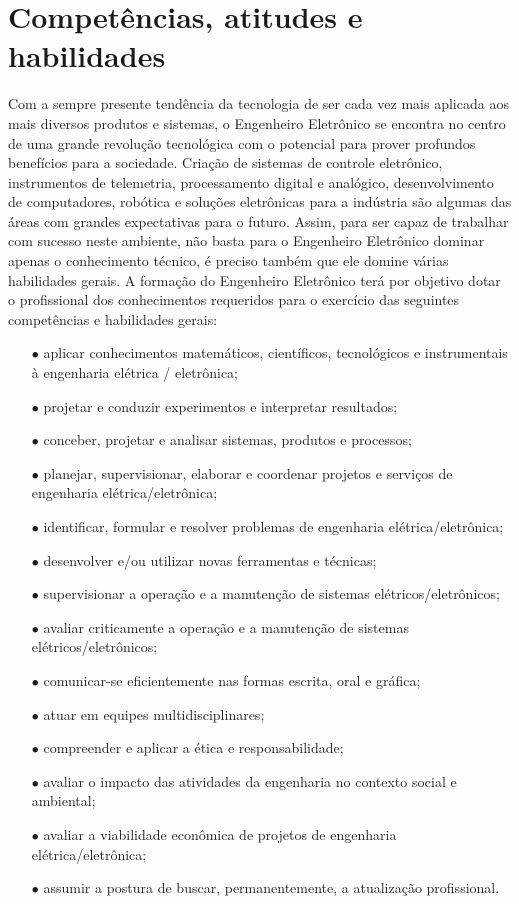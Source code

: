 \chapter{Competências, atitudes e habilidades}
\label{cap7}

Com a sempre presente tendência da tecnologia de ser cada vez mais aplicada aos mais diversos produtos e sistemas, o Engenheiro Eletrônico se encontra no centro de uma grande revolução tecnológica com o potencial para prover profundos benefícios para a sociedade. Criação de sistemas de controle eletrônico, instrumentos de telemetria, processamento digital e analógico, desenvolvimento de computadores, robótica e soluções eletrônicas para a indústria são algumas das áreas com grandes expectativas para o futuro. Assim, para ser capaz de trabalhar com sucesso neste ambiente, não basta para o Engenheiro Eletrônico dominar apenas o conhecimento técnico, é preciso também que ele domine várias habilidades gerais. A formação do Engenheiro Eletrônico terá por objetivo dotar o profissional dos conhecimentos requeridos para o exercício das seguintes competências e habilidades gerais:
\begin{enumerate}
\item[$\bullet$] aplicar conhecimentos matemáticos, científicos, tecnológicos e instrumentais à engenharia elétrica / eletrônica;
\item[$\bullet$] projetar e conduzir experimentos e interpretar resultados;
\item[$\bullet$] conceber, projetar e analisar sistemas, produtos e processos;
\item[$\bullet$] planejar, supervisionar, elaborar e coordenar projetos e serviços de engenharia elétrica/eletrônica;
\item[$\bullet$] identificar, formular e resolver problemas de engenharia elétrica/eletrônica;
\item[$\bullet$] desenvolver e/ou utilizar novas ferramentas e técnicas;
\item[$\bullet$] supervisionar a operação e a manutenção de sistemas elétricos/eletrônicos;
\item[$\bullet$] avaliar criticamente a operação e a manutenção de sistemas elétricos/eletrônicos;
\item[$\bullet$] comunicar-se eficientemente nas formas escrita, oral e gráfica;
\item[$\bullet$] atuar em equipes multidisciplinares;
\item[$\bullet$] compreender e aplicar a ética e responsabilidade;
\item[$\bullet$] avaliar o impacto das atividades da engenharia no contexto social e ambiental;
\item[$\bullet$] avaliar a viabilidade econômica de projetos de engenharia elétrica/eletrônica;
\item[$\bullet$] assumir a postura de buscar, permanentemente, a atualização profissional.
\end{enumerate}